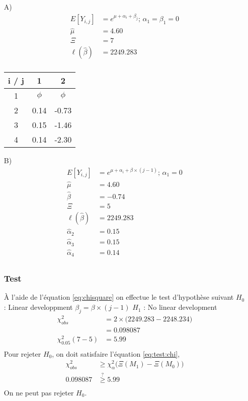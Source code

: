 \documentclass[11pt,french]{report}
\begin{document}
\begin{itemize}
\item[A)] 
\begin{align*}
E[Y_{i,j}] &= e^{\mu + \alpha_i + \beta_j} \text{; } \alpha_1 = \beta_1 = 0 \\
\widehat{\mu} &= 4.60 \\
\Xi &= 7 \\
\ell(\widehat{\beta}) & = 2249.283 \\
\end{align*} 
\begin{center}
\begin{tabular}{|c|c|c|}
  \hline
   i / j & 1 & 2\\ 
  \hline
  1 & $\phi$ & $\phi$  \\
  2 & 0.14 & -0.73    \\
  3 & 0.15 & -1.46    \\
  4 & 0.14 &  -2.30  \\
  \hline
\end{tabular}
\end{center}
\bigskip

\item[B)] 
\begin{align*}
E[Y_{i,j}] &= e^{\mu + \alpha_i + \beta \times (j-1)} \text{; } \alpha_1 = 0 \\
\widehat{\mu} &= 4.60 \\
\widehat{\beta} &= -0.74 \\
\Xi &= 5 \\
\ell(\widehat{\beta}) & = 2249.283 \\
\widehat{\alpha}_2 &= 0.15 \\
\widehat{\alpha}_3 &= 0.15 \\
\widehat{\alpha}_4 &= 0.14 \\
\end{align*} 
\subsubsection*{Test}
À l'aide de l'équation \ref{eq:chisquare} on effectue le test d'hypothèse suivant \newline
$H_0$ : Linear developpment $\beta_j = \beta \times (j-1)$ \newline
$H_1$ :  No linear development
\begin{align*}
\chi_{obs}^2 &= 2 \times \Big( 2249.283 - 2248.234 \Big) \\
&= 0.098087 \\
\chi_{0.05}^2(7 - 5) &= 5.99 \\
\end{align*}
Pour rejeter $H_0$, on doit satisfaire l'équation \ref{eq:test:chi},
\begin{align*}
\chi_{obs}^2 &\geq \chi_{\alpha}^2\Big( \Xi (M_1) - \Xi (M_0) \Big) \\
0.098087 &\overset{?}{\geq} 5.99 \\
\end{align*}
On ne peut pas rejeter $H_0$.
\bigskip


\end{itemize}
\end{document}
